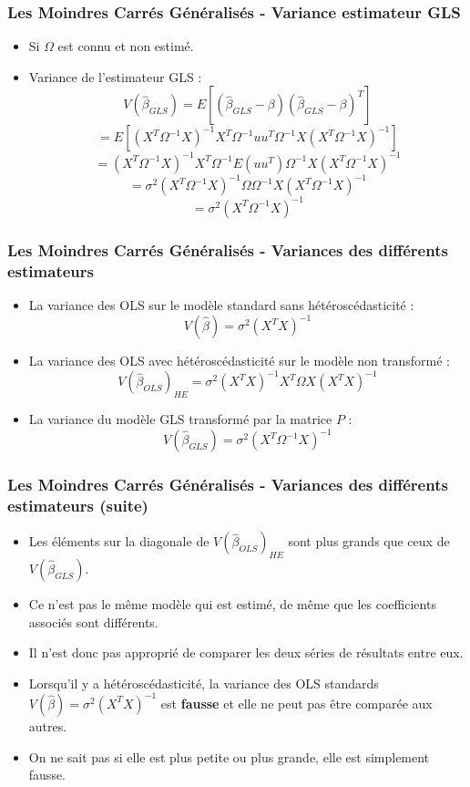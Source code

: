 \documentclass{beamer}
\begin{document}
\begin{frame}
\frametitle{Les Moindres Carrés Généralisés - Variance estimateur GLS}
\begin{itemize}
    \item Si \( \Omega \) est connu et non estimé.
    \item Variance de l'estimateur GLS :
    \[
    V(\hat{\beta}_{GLS}) = E\left[ (\hat{\beta}_{GLS} - \beta)(\hat{\beta}_{GLS} - \beta)^T \right]
    \]
    \[
    = E\left[ (X^T \Omega^{-1} X)^{-1} X^T \Omega^{-1} u u^T \Omega^{-1} X (X^T \Omega^{-1} X)^{-1} \right]
    \]
    \[
    = (X^T \Omega^{-1} X)^{-1} X^T \Omega^{-1} E(u u^T) \Omega^{-1} X (X^T \Omega^{-1} X)^{-1}
    \]
    \[
    = \sigma^2 (X^T \Omega^{-1} X)^{-1} \Omega \Omega^{-1} X (X^T \Omega^{-1} X)^{-1}
    \]
    \[
    = \sigma^2 (X^T \Omega^{-1} X)^{-1}
    \]
\end{itemize}
\end{frame}

\begin{frame}
\frametitle{Les Moindres Carrés Généralisés - Variances des différents estimateurs}
\begin{itemize}
    \item La variance des OLS sur le modèle standard sans hétéroscédasticité :
    \[
    V(\hat{\beta}) = \sigma^2 (X^T X)^{-1}
    \]
    \item La variance des OLS avec hétéroscédasticité sur le modèle non transformé :
    \[
    V(\hat{\beta}_{OLS})_{HE} = \sigma^2 (X^T X)^{-1} X^T \Omega X (X^T X)^{-1}
    \]
    \item La variance du modèle GLS transformé par la matrice \( P \) :
    \[
    V(\hat{\beta}_{GLS}) = \sigma^2 (X^T \Omega^{-1} X)^{-1}
    \]
\end{itemize}
\end{frame}

\begin{frame}
\frametitle{Les Moindres Carrés Généralisés - Variances des différents estimateurs (suite)}
\begin{itemize}
    \item Les éléments sur la diagonale de \( V(\hat{\beta}_{OLS})_{HE} \) sont plus grands que ceux de \( V(\hat{\beta}_{GLS}) \).
    \item Ce n’est pas le même modèle qui est estimé, de même que les coefficients associés sont différents.
    \item Il n’est donc pas approprié de comparer les deux séries de résultats entre eux.
    \item Lorsqu'il y a hétéroscédasticité, la variance des OLS standards \( V(\hat{\beta}) = \sigma^2 (X^T X)^{-1} \) est \textbf{fausse} et elle ne peut pas être comparée aux autres.
    \item On ne sait pas si elle est plus petite ou plus grande, elle est simplement fausse.
\end{itemize}
\end{frame}
\end{document}
